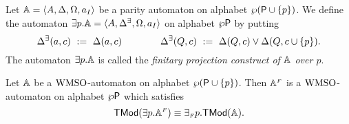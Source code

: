 
\begin{definition}\label{DEF_fin_projection}
Let $\mathbb{A} = \langle{A, \Delta, \Omega, a_I}\rangle$ be a parity automaton on alphabet 
$\wp(\mathsf{P} \cup \{p\})$.
We define the automaton ${{\exists} p}.\mathbb{A} = \langle{A, \Delta^\exists, \Omega, a_I}\rangle$ 
on alphabet $\wp\mathsf{P}$ by putting
\begin{equation*}
  \Delta^\exists(a,c) \ \mathrel{: =} \ \Delta(a,c) \qquad \qquad
  \Delta^\exists(Q,c) \ \mathrel{: =} \ \Delta(Q,c) \vee \Delta(Q,c\cup\{p\}).
\end{equation*}
The automaton ${{\exists} p}.\mathbb{A}$ is called the \emph{finitary projection
construct of $\mathbb{A}$ over $p$}.
\end{definition}


\begin{lemma}\label{PROP_fin_projection}
Let $\mathbb{A}$ be a $\mathrm{WMSO}$-automaton on alphabet $\wp (\mathsf{P} \cup \{p\})$.
Then $\mathbb{A}^{{\scriptscriptstyle F}}$ is a $\mathrm{WMSO}$-automaton on alphabet $\wp\mathsf{P}$ which satisfies
$$\mathsf{TMod}({{\exists} p}.\mathbb{A}^{{\scriptscriptstyle F}}) \equiv
{{\exists_{{\scriptscriptstyle F}}} p}.\mathsf{TMod}(\mathbb{A}).$$
\end{lemma}

